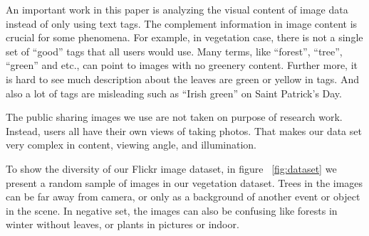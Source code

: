 
An important work in this paper is analyzing the visual content of image data instead of
only using text tags. The complement information in image content is crucial for some phenomena. For example, in vegetation case, 
there is not a single set of ``good''
tags that all users would use. Many terms, like ``forest'', ``tree'', ``green'' and etc., can point to images with no greenery content.
Further more, it is hard to see much description about the leaves are green or yellow in tags.
And also a lot of tags are misleading such as ``Irish green'' on Saint Patrick's Day. 




The public sharing images we use are not taken on purpose of research work. Instead, users all have their own views of taking photos. That makes our data set very complex in content, viewing angle, and illumination. 

To show the diversity of our Flickr image dataset, in figure ~\ref{fig:dataset} we present a random sample of images in our vegetation dataset.
Trees in the images can be far away from camera, or only as a background of another event or object in the scene. In negative set, the images can also be confusing like forests in winter without leaves, or plants in pictures or indoor.

